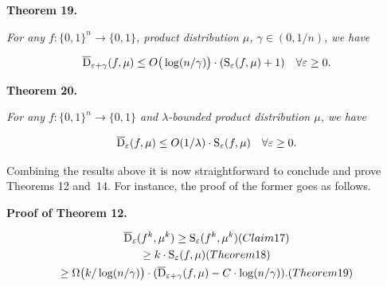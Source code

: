 

\par\medskip\noindent\textbf{
\textbf{Theorem 19}\textbf{.}
}\par



\emph{For any $f\colon\{0,1\}^{n}\to\{0,1\}$, product distribution $\mu$, $\gamma\in(0,1/n)$, we have}\par


\[\begin{gathered}
\overline{{\textup{D}}}_{\varepsilon+\gamma}(f,\mu)\leq O\big{(}\log(n/\gamma)\big{)}\cdot({\textup{S}}_{\varepsilon}(f,\mu)+1)\quad\forall\varepsilon\geq 0.
\end{gathered}\]







\par\medskip\noindent\textbf{
\textbf{Theorem 20}\textbf{.}
}\par



\emph{For any $f\colon\{0,1\}^{n}\to\{0,1\}$ and $\lambda$-bounded product distribution $\mu$, we have}\par


\[\begin{gathered}
\overline{{\textup{D}}}_{\varepsilon}(f,\mu)\leq O(1/\lambda)\cdot{\textup{S}}_{\varepsilon}(f,\mu)\quad\forall\varepsilon\geq 0.
\end{gathered}\]






Combining the results above it is now straightforward to conclude and prove Theorems 12 and 14. For instance, the proof of the former goes as follows.\par




\par\medskip\noindent\textbf{Proof of Theorem 12.}\par




\[\begin{gathered}
\displaystyle\overline{{\textup{D}}}_{\varepsilon}(f^{k},\mu^{k}) \displaystyle\geq{\textup{S}}_{\varepsilon}(f^{k},\mu^{k}) (Claim 17) \\
\displaystyle\geq k\cdot{\textup{S}}_{\varepsilon}(f,\mu) (Theorem 18) \\
\displaystyle\geq\Omega\big{(}k/\log(n/\gamma)\big{)}\cdot(\overline{{\textup{D}}}_{\varepsilon+\gamma}(f,\mu)-C\cdot\log(n/\gamma)). (Theorem 19)
\end{gathered}\]


